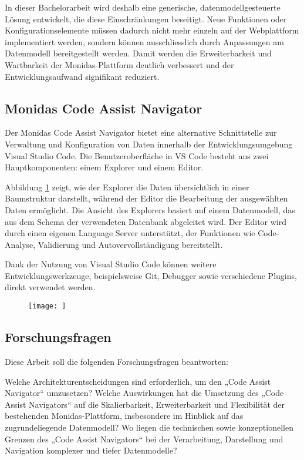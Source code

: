 In dieser Bachelorarbeit wird deshalb eine generische, datenmodellgesteuerte Lösung entwickelt, die diese Einschränkungen beseitigt. Neue Funktionen oder Konfigurationselemente müssen dadurch nicht mehr einzeln auf der Webplattform implementiert werden, sondern können ausschliesslich durch Anpassungen am Datenmodell bereitgestellt werden. Damit werden die Erweiterbarkeit und Wartbarkeit der Monidas-Plattform deutlich verbessert und der Entwicklungsaufwand signifikant reduziert.

\subsection{Monidas Code Assist Navigator}
Der Monidas Code Assist Navigator bietet eine alternative Schnittstelle zur Verwaltung und Konfiguration von Daten innerhalb der Entwicklungsumgebung Visual Studio Code. Die Benutzeroberfläche in VS Code besteht aus zwei Hauptkomponenten: einem Explorer und einem Editor.

Abbildung \ref{fig:res} zeigt, wie der Explorer die Daten übersichtlich in einer Baumstruktur darstellt, während der Editor die Bearbeitung der ausgewählten Daten ermöglicht. Die Ansicht des Explorers basiert auf einem Datenmodell, das aus dem Schema der verwendeten Datenbank abgeleitet wird. Der Editor wird durch einen eigenen Language Server unterstützt, der Funktionen wie Code-Analyse, Validierung und Autovervollständigung bereitstellt.

Dank der Nutzung von Visual Studio Code können weitere Entwicklungswerkzeuge, beispielsweise Git, Debugger sowie verschiedene Plugins, direkt verwendet werden.


\begin{figure}[H]
  \centering
  \texttt{[image: ]}
  \caption{}
  \label{fig:res}
\end{figure}

\newpage

\subsection{Forschungsfragen}

Diese Arbeit soll die folgenden Forschungsfragen beantworten:

Welche Architekturentscheidungen sind erforderlich, um den „Code Assist Navigator“ umzusetzen? Welche Auswirkungen hat die Umsetzung des „Code Assist Navigators“ auf die Skalierbarkeit, Erweiterbarkeit und Flexibilität der bestehenden Monidas-Plattform, insbesondere im Hinblick auf das zugrundeliegende Datenmodell? Wo liegen die technischen sowie konzeptionellen Grenzen des „Code Assist Navigators“ bei der Verarbeitung, Darstellung und Navigation komplexer und tiefer Datenmodelle?

